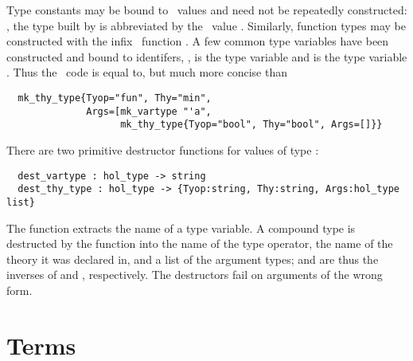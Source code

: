 Type constants may be
bound to \ML\ values and need not be repeatedly constructed: \eg, the type built by
 is abbreviated
by the \ML\ value . Similarly, function types may be constructed
with the infix \ML\ function \ml{-->}. A few common type variables
have been constructed and bound to \ML{} identifers, \eg, 
is the type variable  and  is the type variable
.  Thus the \ML\ code  is equal to, but much more concise than
%
{\small
\begin{verbatim}
  mk_thy_type{Tyop="fun", Thy="min",
              Args=[mk_vartype "'a",
                    mk_thy_type{Tyop="bool", Thy="bool", Args=[]}}
\end{verbatim}
}


\noindent
There are two primitive destructor
%
%
functions for values of type :
\begin{boxed}
\begin{verbatim}
  dest_vartype : hol_type -> string
  dest_thy_type : hol_type -> {Tyop:string, Thy:string, Args:hol_type list}
\end{verbatim}
\end{boxed}

\noindent The function 
%
%
extracts the name of a type variable.  A compound type is destructed
by the function  into the name of the type
operator, the name of the theory it was declared in, and a list of the
argument types;  and  are thus
the inverses of  and , respectively.
The destructors fail on arguments of the wrong form.

\section{Terms}\label{avra_terms}

